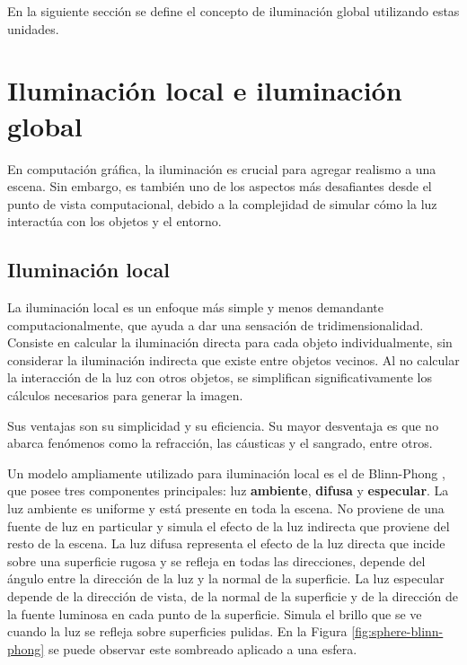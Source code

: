 En la siguiente sección se define el concepto de iluminación global utilizando estas unidades.

\section{Iluminación local e iluminación global}\label{sec:local_vs_global}

En computación gráfica, la iluminación es crucial para agregar realismo a una escena.
Sin embargo, es también uno de los aspectos más desafiantes desde el punto de vista computacional, debido a la complejidad de simular cómo la luz interactúa con los objetos y el entorno.

\subsection{Iluminación local}

La iluminación local \cite[p.~375]{rtr} es un enfoque más simple y menos demandante computacionalmente, que ayuda a dar una sensación de tridimensionalidad.
Consiste en calcular la iluminación directa para cada objeto individualmente, sin considerar la iluminación indirecta que existe entre objetos vecinos.
Al no calcular la interacción de la luz con otros objetos, se simplifican significativamente los cálculos necesarios para generar la imagen.

Sus ventajas son su simplicidad y su eficiencia.
Su mayor desventaja es que no abarca fenómenos como la refracción, las cáusticas y el sangrado, entre otros.

Un modelo ampliamente utilizado para iluminación local es el de Blinn-Phong \cite{blinn-phong}, que posee tres componentes principales: luz \textbf{ambiente}, \textbf{difusa} y \textbf{especular}.
La luz ambiente es uniforme y está presente en toda la escena.
No proviene de una fuente de luz en particular y simula el efecto de la luz indirecta que proviene del resto de la escena.
La luz difusa representa el efecto de la luz directa que incide sobre una superficie rugosa y se refleja en todas las direcciones, depende del ángulo entre la dirección de la luz y la normal de la superficie.
La luz especular depende de la dirección de vista, de la normal de la superficie y de la dirección de la fuente luminosa en cada punto de la superficie.
Simula el brillo que se ve cuando la luz se refleja sobre superficies pulidas.
En la Figura \ref{fig:sphere-blinn-phong} se puede observar este sombreado aplicado a una esfera.

